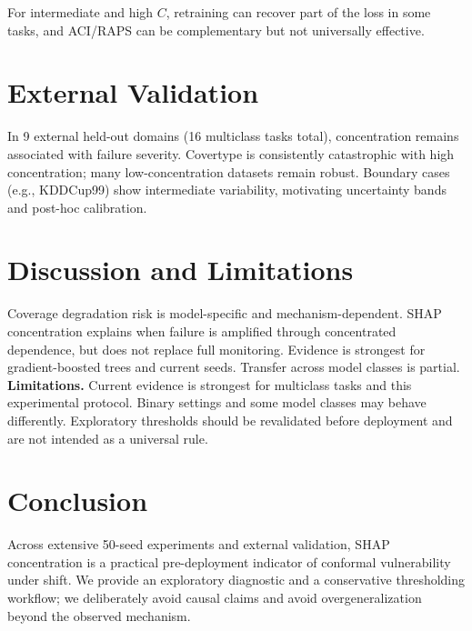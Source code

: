 \documentclass[sigconf,anonymous]{acmart}
\begin{document}
For intermediate and high $C$, retraining can recover part of the loss in some tasks, and ACI/RAPS can be complementary but not universally effective.

\section{External Validation}
In 9 external held-out domains (16 multiclass tasks total), concentration remains associated with failure severity. Covertype is consistently catastrophic with high concentration; many low-concentration datasets remain robust. Boundary cases (e.g., KDDCup99) show intermediate variability, motivating uncertainty bands and post-hoc calibration.

\section{Discussion and Limitations}
\begingroup
{}
\begin{sloppypar}
\begin{raggedright}
Coverage degradation risk is model-specific and mechanism-dependent. SHAP concentration explains when failure is amplified through concentrated dependence, but does not replace full monitoring.
Evidence is strongest for gradient-boosted trees and current seeds.
Transfer across model classes is partial.
\textbf{Limitations.} Current evidence is strongest for multiclass tasks and this experimental protocol. Binary settings and some model classes may behave differently.
Exploratory thresholds should be revalidated before deployment and are not intended as a universal rule.
\end{raggedright}
\end{sloppypar}
\endgroup

\section{Conclusion}
Across extensive 50-seed experiments and external validation, SHAP concentration is a practical pre-deployment indicator of conformal vulnerability under shift. We provide an exploratory diagnostic and a conservative thresholding workflow; we deliberately avoid causal claims and avoid overgeneralization beyond the observed mechanism.


\end{document}
